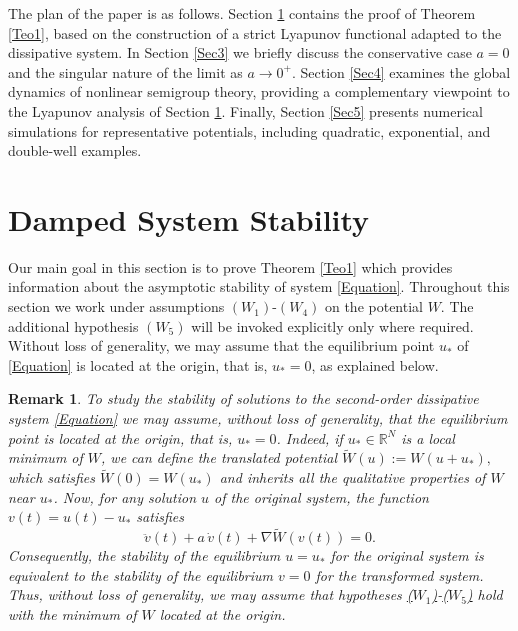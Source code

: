 \documentclass[12pt]{amsart}
\numberwithin{equation}{section}
\newtheorem{remark}[theorem]{Remark}
\begin{document}
The plan of the paper is as follows. Section \ref{Sec2} contains the proof of Theorem \ref{Teo1}, based on the construction of a strict Lyapunov functional adapted to the dissipative system. In Section \ref{Sec3} we briefly discuss the conservative case $a=0$ and the singular nature of the limit as $a\to 0^{+}$. Section \ref{Sec4} examines the global dynamics of nonlinear semigroup theory, providing a complementary viewpoint to the Lyapunov analysis of Section \ref{Sec2}. Finally, Section \ref{Sec5} presents numerical simulations for representative potentials, including quadratic, exponential, and double-well examples. 


\section{Damped System Stability}\label{Sec2}

Our main goal in this section is to prove Theorem \ref{Teo1} which provides information about the asymptotic stability of system \eqref{Equation}. Throughout this section we work under assumptions \hyperlink{W1}{$(W_1)$}-\hyperlink{W4}{$(W_4)$} on the potential $W$. The additional hypothesis \hyperlink{W5}{$(W_5)$} will be invoked explicitly only where required. Without loss of generality, we may assume that the equilibrium point $u_*$ of \eqref{Equation} is located at the origin, that is, $u_*=0$, as explained below.

\begin{remark}\label{remark-translation} \rm
To study the stability of solutions to the second-order dissipative system \eqref{Equation} we may assume, without loss of generality, that the equilibrium point is located at the origin, that is, $u_* = 0$. Indeed, if $u_* \in \mathbb{R}^N$ is a local minimum of $W$, we can define the translated potential $\widetilde{W}(u) := W(u + u_*),$ which satisfies $\widetilde{W}(0) = W(u_*)$ and inherits all the qualitative properties of $W$ near $u_*$. Now, for any solution $u$ of the original system, the function $v(t) = u(t) - u_*$ satisfies
$$
\ddot{v}(t) + a\,\dot{v}(t) + \nabla \widetilde{W}(v(t)) = 0.
$$
Consequently, the stability of the equilibrium $u=u_*$ for the original system is equivalent to the stability of the equilibrium $v=0$ for the transformed system. Thus, without loss of generality, we may assume that hypotheses \hyperlink{W1}{($W_1$)}-\hyperlink{W5}{($W_5$)} hold with the minimum of $W$ located at the origin. 
\end{remark}
\end{document}
